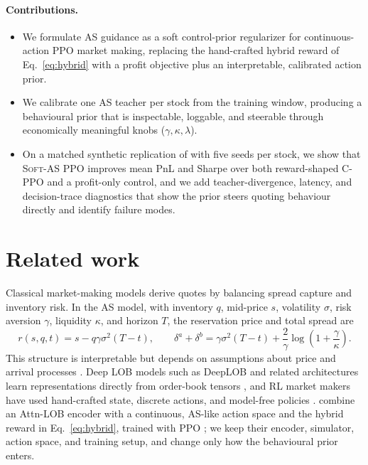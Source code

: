 \documentclass{article}
\newcommand{\softas}{\textsc{Soft-AS PPO}}
\newcommand{\cppo}{\textsc{C-PPO}}
\begin{document}
\paragraph{Contributions.}
\begin{itemize}[leftmargin=1.4em,itemsep=2pt,topsep=2pt]
\item We formulate AS guidance as a soft control-prior regularizer for continuous-action PPO market making, replacing the hand-crafted hybrid reward of Eq.~\eqref{eq:hybrid} with a profit objective plus an interpretable, calibrated action prior.
\item We calibrate one AS teacher per stock from the training window, producing a behavioural prior that is inspectable, loggable, and steerable through economically meaningful knobs ($\gamma,\kappa,\lambda$).
\item On a matched synthetic replication of \citet{guo2023mm} with five seeds per stock, we show that \softas{} improves mean PnL and Sharpe over both reward-shaped \cppo{} and a profit-only control, and we add teacher-divergence, latency, and decision-trace diagnostics that show the prior steers quoting behaviour directly and identify failure modes.
\end{itemize}

\section{Related work}
\label{sec:related}

Classical market-making models derive quotes by balancing spread capture and inventory risk. In the AS model, with inventory $q$, mid-price $s$, volatility $\sigma$, risk aversion $\gamma$, liquidity $\kappa$, and horizon $T$, the reservation price and total spread are
\begin{equation}
r(s,q,t)=s-q\gamma\sigma^2(T-t),
\qquad
\delta^a+\delta^b=\gamma\sigma^2(T-t)+\frac{2}{\gamma}\log\!\left(1+\frac{\gamma}{\kappa}\right).
\label{eq:as}
\end{equation}
This structure is interpretable but depends on assumptions about price and arrival processes \citep{gueant2013}. Deep LOB models such as DeepLOB and related architectures learn representations directly from order-book tensors \citep{zhang2019deeplob,tsantekidis2020,ntakaris2019}, and RL market makers have used hand-crafted state, discrete actions, and model-free policies \citep{lim2018,spooner2018,zhong2020,sadighian2019,gasperov2021}. \citet{guo2023mm} combine an Attn-LOB encoder with a continuous, AS-like action space and the hybrid reward in Eq.~\eqref{eq:hybrid}, trained with PPO \citep{schulman2017ppo}; we keep their encoder, simulator, action space, and training setup, and change only how the behavioural prior enters.
\end{document}
